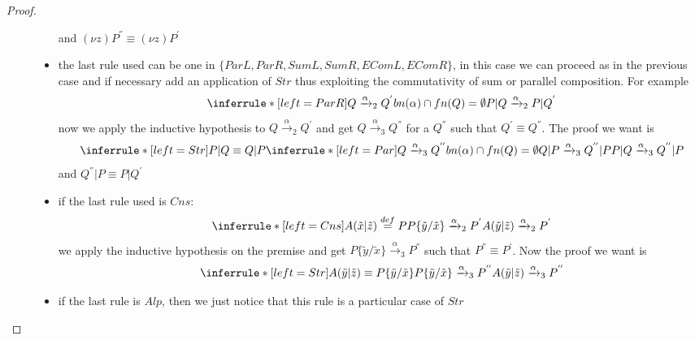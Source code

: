 \begin{lemma}
\begin{proof}
\begin{description}
\begin{itemize}
\[{		  }
		\]
		and $(\nu z) P^{''}\equiv (\nu z) P^{'}$
	      \item
		the last rule used can be one in $\{ParL, ParR, SumL, SumR, EComL, EComR\}$, in this case we can proceed as in the previous case and if necessary add an application of $Str$ thus exploiting the commutativity of sum or parallel composition. For example
		\[
		  \inferrule* [left=ParR]{
		      Q\xrightarrow{\alpha}_{2}Q^{'}
		    \\
		      bn(\alpha)\cap fn(Q)=\emptyset
		  }{
		      P|Q\xrightarrow{\alpha}_{2}P|Q^{'}
		  }
		\]	
		now we apply the inductive hypothesis to $Q\xrightarrow{\alpha}_{2}Q^{'}$ and get $Q\xrightarrow{\alpha}_{3}Q^{''}$ for a $Q^{''}$ such that $Q^{'}\equiv Q^{''}$. The proof we want is
		\[
		  \inferrule* [left=Str]{
		      P|Q\equiv Q|P
		    \\
		      \inferrule* [left=Par]{
			  Q\xrightarrow{\alpha}_{3}Q^{''}
			\\
			  bn(\alpha)\cap fn(Q)=\emptyset
		      }{
			  Q|P\xrightarrow{\alpha}_{3}Q^{''}|P
		      }
		    }{
		      P|Q\xrightarrow{\alpha}_{3}Q^{''}|P
		    }
		\]
		and $Q^{''}|P\equiv P|Q^{'}$
	      \item
		if the last rule used is $Cns$:
		\[
		    \inferrule* [left=Cns]{
			A(\tilde{x}|\tilde{z})\stackrel{def}{=}P
		      \\
			P\{\tilde{y}/\tilde{x}\}\xrightarrow{\alpha}_{2}P^{'}
		    }{
		      A(\tilde{y}|\tilde{z})\xrightarrow{\alpha}_{2}P^{'}
		    }
		\]
		we apply the inductive hypothesis on the premise and get $P\{\tilde{y}/\tilde{x}\}\xrightarrow{\alpha}_{3}P^{''}$ such that $P^{''}\equiv P^{'}$. Now the proof we want is
		\[
		    \inferrule* [left=Str]{
			A(\tilde{y}|\tilde{z})\equiv P\{\tilde{y}/\tilde{x}\}
		      \\
			P\{\tilde{y}/\tilde{x}\}\xrightarrow{\alpha}_{3}P^{''}
		    }{
		      A(\tilde{y}|\tilde{z})\xrightarrow{\alpha}_{3}P^{''}
		    }
		\]		
	      \item
		if the last rule is $Alp$, then we just notice that this rule is a particular case of $Str$

\end{itemize}
\end{description}
\end{proof}
\end{lemma}
